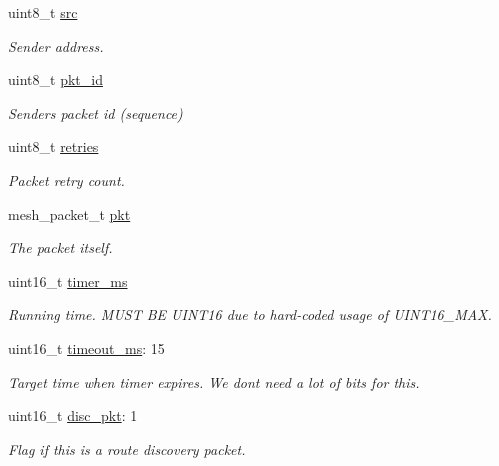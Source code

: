 \begin{DoxyCompactItemize}
\item 
uint8\+\_\+t \hyperlink{struct____attribute_____a3269a81ad93d0affbeabf284e63829aa}{src}
\begin{DoxyCompactList}\small\item\em Sender address. \end{DoxyCompactList}\item 
uint8\+\_\+t \hyperlink{struct____attribute_____a498bfd7c451026ed73b80a3e0a4169fc}{pkt\+\_\+id}
\begin{DoxyCompactList}\small\item\em Sender\textquotesingle{}s packet id (sequence) \end{DoxyCompactList}\item 
uint8\+\_\+t \hyperlink{struct____attribute_____a70bb4d640fb24d470e94698c04440d1e}{retries}
\begin{DoxyCompactList}\small\item\em Packet retry count. \end{DoxyCompactList}\item 
mesh\+\_\+packet\+\_\+t \hyperlink{struct____attribute_____a09b2479a59537aae24561247294fa398}{pkt}
\begin{DoxyCompactList}\small\item\em The packet itself. \end{DoxyCompactList}\item 
uint16\+\_\+t \hyperlink{struct____attribute_____a029c6f0fb55fdad96770454f90e12ce1}{timer\+\_\+ms}
\begin{DoxyCompactList}\small\item\em Running time. M\+U\+ST BE U\+I\+N\+T16 due to hard-\/coded usage of U\+I\+N\+T16\+\_\+\+M\+AX. \end{DoxyCompactList}\item 
uint16\+\_\+t \hyperlink{struct____attribute_____a9f3aa35286aea8d6a20a5358b3730361}{timeout\+\_\+ms}\+: 15
\begin{DoxyCompactList}\small\item\em Target time when timer expires. We don\textquotesingle{}t need a lot of bits for this. \end{DoxyCompactList}\item 
uint16\+\_\+t \hyperlink{struct____attribute_____aaf5ef4d6e36b400b9a6d01cd5d84a6fe}{disc\+\_\+pkt}\+: 1
\begin{DoxyCompactList}\small\item\em Flag if this is a route discovery packet. \end{DoxyCompactList}\item 

\end{DoxyCompactItemize}
